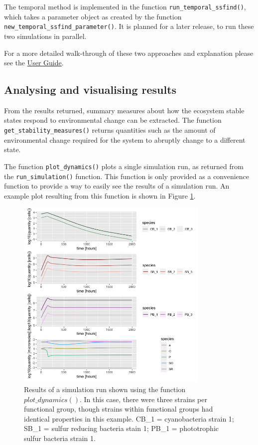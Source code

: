 \documentclass[preprint,12pt, a4paper]{elsarticle}
\begin{document}
The temporal method is implemented in the function
\texttt{run\_temporal\_ssfind()}, which takes a parameter object as
created by the function \texttt{new\_temporal\_ssfind\_parameter()}. It
is planned for a later release, to run these two simulations in
parallel.

For a more detailed walk-through of these two approaches and explanation
please see the
\href{https://uzh-peg.r-universe.dev/articles/microxanox/User-guide.html}{User
Guide}.

\hypertarget{analysing-and-visualising-results}{%
\subsection{Analysing and visualising
results}\label{analysing-and-visualising-results}}

From the results returned, summary measures about how the ecosystem
stable states respond to environmental change can be extracted. The
function \texttt{get\_stability\_measures()} returns quantities such as
the amount of environmental change required for the system to abruptly
change to a different state.

The function \texttt{plot\_dynamics()} plots a single simulation run, as
returned from the \texttt{run\_simulation()} function. This function is
only provided as a convenience function to provide a way to easily see
the results of a simulation run. An example plot resulting from this
function is shown in Figure \ref{fig:plot-dynamics}.

\begin{figure}

{\centering \includegraphics[width=350px]{figures/ug_three_strains_dynamics} 

}

\caption{Results of a simulation run shown using the function $plot\_dynamics()$. In this case, there were three strains per functional group, though strains within functional groups had identical properties in this example. CB\_1 = cyanobacteria strain 1; SB\_1 = sulfur reducing bacteria stain 1; PB\_1 = phototrophic sulfur bacteria strain 1.}\label{fig:plot-dynamics}
\end{figure}
\end{document}
